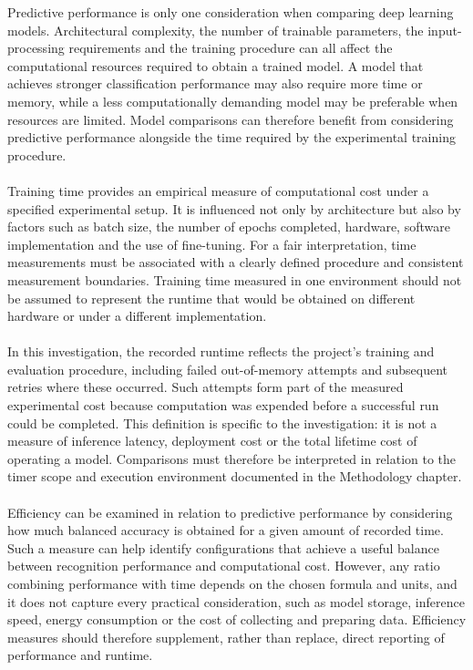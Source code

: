 \documentclass[12pt, a4paper]{report}
\begin{document}
				Predictive performance is only one consideration when comparing deep learning models. Architectural complexity, the number of trainable parameters, the input-processing requirements and the training procedure can all affect the computational resources required to obtain a trained model. A model that achieves stronger classification performance may also require more time or memory, while a less computationally demanding model may be preferable when resources are limited. Model comparisons can therefore benefit from considering predictive performance alongside the time required by the experimental training procedure.\\\\
				Training time provides an empirical measure of computational cost under a specified experimental setup. It is influenced not only by architecture but also by factors such as batch size, the number of epochs completed, hardware, software implementation and the use of fine-tuning. For a fair interpretation, time measurements must be associated with a clearly defined procedure and consistent measurement boundaries. Training time measured in one environment should not be assumed to represent the runtime that would be obtained on different hardware or under a different implementation.\\\\
				In this investigation, the recorded runtime reflects the project's training and evaluation procedure, including failed out-of-memory attempts and subsequent retries where these occurred. Such attempts form part of the measured experimental cost because computation was expended before a successful run could be completed. This definition is specific to the investigation: it is not a measure of inference latency, deployment cost or the total lifetime cost of operating a model. Comparisons must therefore be interpreted in relation to the timer scope and execution environment documented in the Methodology chapter.\\\\
				Efficiency can be examined in relation to predictive performance by considering how much balanced accuracy is obtained for a given amount of recorded time. Such a measure can help identify configurations that achieve a useful balance between recognition performance and computational cost. However, any ratio combining performance with time depends on the chosen formula and units, and it does not capture every practical consideration, such as model storage, inference speed, energy consumption or the cost of collecting and preparing data. Efficiency measures should therefore supplement, rather than replace, direct reporting of performance and runtime.\\\\
\end{document}
